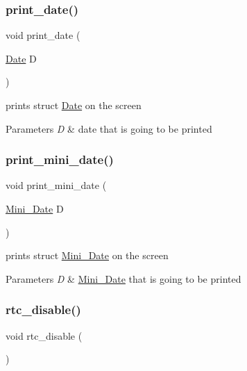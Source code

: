 \subsubsection{\texorpdfstring{print\+\_\+date()}{print\_date()}}
{\footnotesize\ttfamily void print\+\_\+date (\begin{DoxyParamCaption}\item[{\mbox{\hyperlink{struct_date}{Date}}}]{D }\end{DoxyParamCaption})}



prints struct \mbox{\hyperlink{struct_date}{Date}} on the screen 


\begin{DoxyParams}{Parameters}
{\em D} & date that is going to be printed \\
\hline
\end{DoxyParams}
\mbox{\label{group__rtc_ga5b6078e999e62dd4c58f70ebbfe32c53}} 
\subsubsection{\texorpdfstring{print\+\_\+mini\+\_\+date()}{print\_mini\_date()}}
{\footnotesize\ttfamily void print\+\_\+mini\+\_\+date (\begin{DoxyParamCaption}\item[{\mbox{\hyperlink{struct_mini___date}{Mini\+\_\+\+Date}}}]{D }\end{DoxyParamCaption})}



prints struct \mbox{\hyperlink{struct_mini___date}{Mini\+\_\+\+Date}} on the screen 


\begin{DoxyParams}{Parameters}
{\em D} & \mbox{\hyperlink{struct_mini___date}{Mini\+\_\+\+Date}} that is going to be printed \\
\hline
\end{DoxyParams}
\mbox{\label{group__rtc_gaeb55d907395f650cc700c948cfc6eadb}} 
\subsubsection{\texorpdfstring{rtc\+\_\+disable()}{rtc\_disable()}}
{\footnotesize\ttfamily void rtc\+\_\+disable (\begin{DoxyParamCaption}{ }\end{DoxyParamCaption})}



